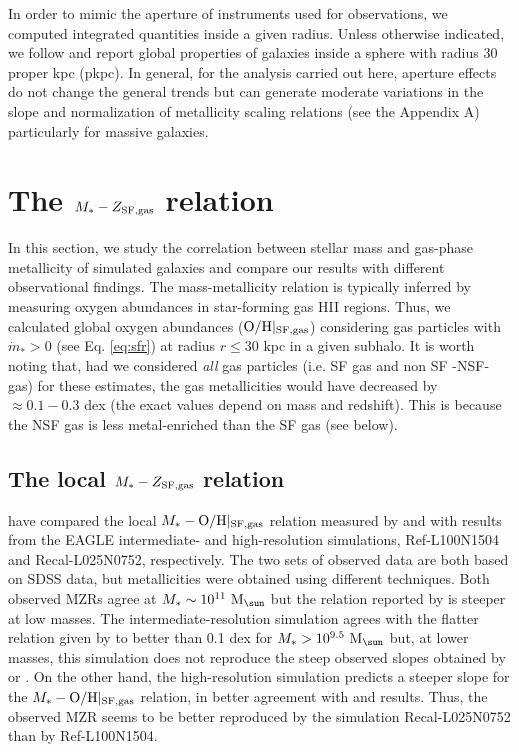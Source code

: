 \documentclass[useAMS,usenatbib]{mn2e}
\begin{document}
In order to mimic the aperture of instruments used for observations, we computed
integrated quantities inside a given radius.  Unless otherwise indicated, we follow
\citet{schaye2015} and
report global properties of galaxies inside a sphere with radius 30 proper kpc (pkpc).  In general, for the analysis carried
out here, aperture effects do not change the general trends but can generate moderate
variations in the slope and normalization of metallicity scaling relations (see the Appendix A)
particularly for massive galaxies. 






\section{The $M_{*} - Z_{\rm SF,gas}$ relation}
\label{sec:gas_mzr}

In this section, we study the correlation between stellar mass and gas-phase metallicity
of simulated galaxies and compare our results with different observational findings.
The mass-metallicity relation is typically inferred by measuring oxygen abundances in star-forming gas
HII regions. 
Thus, we calculated global oxygen abundances (${\rm O/H}|_{\rm SF,gas}$) considering gas particles 
with ${\dot m}_* > 0$ (see Eq. \ref{eq:sfr}) at radius $r \le 30$ kpc in a given subhalo.
It is worth noting that, had we considered {\it all} gas particles (i.e. SF gas and non SF -NSF- gas) 
for these estimates, the gas metallicities would have decreased by $\approx 0.1-0.3$
dex (the exact values depend on mass and redshift).  This is because the NSF gas is less metal-enriched 
than the SF gas (see below).


\subsection{The local $M_{*} - Z_{\rm SF,gas}$ relation}
\label{sec:gas_mzr_z0}

\citet{schaye2015} have compared the local $M_* - {\rm O/H}|_{\rm SF,gas}$ relation 
measured by \citet{tremonti2004} and \citet{zahid2014a} with results from the
{\sc EAGLE} intermediate- and high-resolution simulations,
Ref-L100N1504 and Recal-L025N0752, respectively.  The two sets of observed data
are both based on SDSS data, but metallicities were obtained using different techniques.
Both observed MZRs agree at $M_* \sim 10^{11} \ {\rm M}_{\sun}$ but the relation
reported by \citet{tremonti2004} is steeper at low masses.
The intermediate-resolution simulation agrees with the flatter relation given by \citet{zahid2014a} 
to better than 0.1 dex for $M_* > 10^{9.5} \ {\rm M}_{\sun}$ but, at lower masses, this
simulation does not reproduce the steep
observed slopes obtained by \citet{tremonti2004} or \citet{zahid2014a}.  On the other hand, the high-resolution simulation
predicts a steeper slope for the $M_* - {\rm O/H}|_{\rm SF,gas}$ relation, 
in better agreement with \citet{tremonti2004} and \citet{zahid2014a} results.
Thus, the observed MZR seems to be better reproduced
by the simulation Recal-L025N0752 than by Ref-L100N1504.
\end{document}
